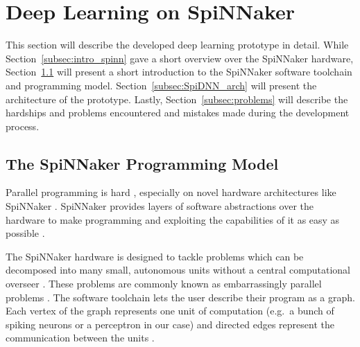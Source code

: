\documentclass[]{article}
\begin{document}


\section{Deep Learning on SpiNNaker} %
\label{sec:SpiDNN}

This section will describe the developed deep learning prototype in
detail.
While Section~\ref{subsec:intro_spinn} gave a short overview over the
SpiNNaker hardware, Section~\ref{subsec:spinn_toolchain} will present
a short introduction to the SpiNNaker software toolchain and
programming model.
Section~\ref{subsec:SpiDNN_arch} will present the architecture of the
prototype.
Lastly, Section~\ref{subsec:problems} will describe the
hardships and problems encountered and mistakes made during the
development process.


\subsection{The SpiNNaker Programming Model} %
\label{subsec:spinn_toolchain}

Parallel programming is hard \citep{lee_2011}, especially on novel
hardware architectures like SpiNNaker \citep{brown_et_al_2015}.
SpiNNaker provides layers of software abstractions over the hardware
to make programming and exploiting the capabilities of it as easy as
possible \citep{furber_et_al_2020}.

The SpiNNaker hardware is designed to tackle problems which can be
decomposed into many small, autonomous units without a central
computational overseer \citep{brown_et_al_2015}.
These problems are commonly known as embarrassingly parallel problems
\citep{foster_1995}.
The software toolchain lets the user describe their program as a
graph.
Each vertex of the graph represents one unit of computation
(e.g.\ a bunch of spiking neurons or a perceptron in our case)
and directed edges represent the communication between the units
\citep{furber_et_al_2020}.
\end{document}
